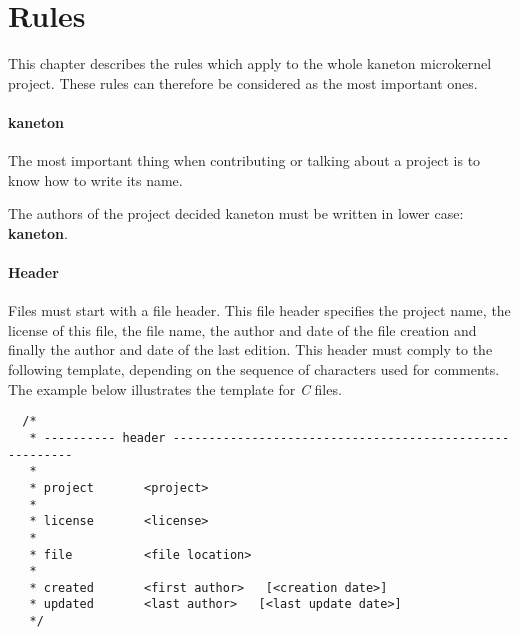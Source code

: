 %
%
%
%
%
%

%
%

\chapter{Rules}
\label{chapter:rules}

This chapter describes the rules which apply to the whole kaneton microkernel
project. These rules can therefore be considered as the most important ones.

\newpage

%
%


\subsubsection{kaneton}

The most important thing when contributing or talking about a project is
to know how to write its name.

The authors of the project decided kaneton must be written in lower case:
\textbf{kaneton}.


\subsubsection{Header}

Files must start with a file header. This file header specifies the
project name, the license of this file, the file name, the author and
date of the file creation and finally the author and date of the last
edition. This header must comply to the following template, depending
on the sequence of characters used for comments. The example below illustrates
the template for \textit{C} files.

\begin{verbatim}
  /*
   * ---------- header --------------------------------------------------------
   *
   * project       <project>
   *
   * license       <license>
   *
   * file          <file location>
   *
   * created       <first author>   [<creation date>]
   * updated       <last author>   [<last update date>]
   */
\end{verbatim}

